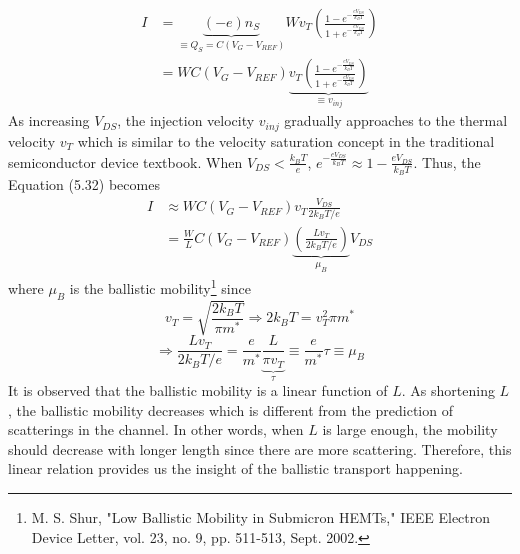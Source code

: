 \begin{align}
    I& = \underbrace{(-e)n_{S}}_{\equiv Q_{S}=C(V_{G}-V_{REF})}Wv_{T}\left(\frac{1-e^{-\frac{eV_{DS}}{k_{B}T}}}{1+e^{-\frac{eV_{DS}}{k_{B}T}}}\right)\nonumber\\
    & = WC(V_{G}-V_{REF})\underbrace{v_{T}\left(\frac{1-e^{-\frac{eV_{DS}}{k_{B}T}}}{1+e^{-\frac{eV_{DS}}{k_{B}T}}}\right)}_{\equiv v_{inj}}
\end{align} As increasing $V_{DS}$, the injection velocity $v_{inj}$ gradually approaches to the thermal velocity $v_{T}$ which is similar to the velocity saturation concept in the traditional semiconductor device textbook. When $V_{DS} < \frac{k_{B}T}{e}$, $e^{-\frac{eV_{DS}}{k_{B}T}}\approx 1-\frac{eV_{DS}}{k_{B}T}$. Thus, the Equation (5.32) becomes \begin{align}
    I& \approx WC(V_{G}-V_{REF})v_{T}\frac{V_{DS}}{2k_{B}T/e}\nonumber\\
    & = \frac{W}{L}C(V_{G}-V_{REF})\underbrace{\left(\frac{Lv_{T}}{2k_{B}T/e}\right)}_{\mu_{B}}V_{DS}
\end{align} where $\mu_{B}$ is the ballistic mobility\footnote{M. S. Shur, "Low Ballistic Mobility in Submicron HEMTs," IEEE Electron Device Letter, vol. 23, no. 9, pp. 511-513, Sept. 2002.} since \begin{equation}
    v_{T} = \sqrt{\frac{2k_{B}T}{\pi m^{*}}} \Rightarrow 2k_{B}T = v_{T}^{2}\pi m^{*}
\end{equation} \begin{equation}
    \Rightarrow \frac{Lv_{T}}{2k_{B}T/e} = \frac{e}{m^{*}}\underbrace{\frac{L}{\pi v_{T}}}_{\tau} \equiv \frac{e}{m^{*}}\tau \equiv \mu_{B}
\end{equation} It is observed that the ballistic mobility is a linear function of $L$. As shortening $L$, the ballistic mobility decreases which is different from the prediction of scatterings in the channel. In other words, when $L$ is large enough, the mobility should decrease with longer length since there are more scattering. Therefore, this linear relation provides us the insight of the ballistic transport happening.
